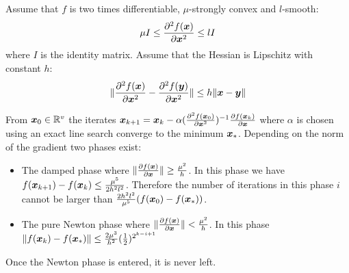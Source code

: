 \begin{prop}
  \label{eq:conv:newton}
  Assume that $f$ is two times differentiable, $\mu$-strongly convex and $l$-smooth:
  \begin{equation}
    \mu I \leq \partialfrac{\xb^2}{^2 f(\xb)} \leq l I
  \end{equation}
  where $I$ is the identity matrix.
  Assume that the Hessian is Lipschitz with constant $h$:
  \begin{equation}
  \| \partialfrac{\xb^2}{^2 f(\xb)} - \partialfrac{\xb^2}{^2 f(\yb)} \| \leq h \| \xb
  - \yb \|
 \end{equation}

  From $\xb_0 \in \RR^v$  the iterates
  $\xb_{k+1} = \xb_k -\alpha (\partialfrac{\xb^2}{^2 f(\xb_0)})^{-1}
  \partialfrac{\xb}{f(\xb_k)}$ where $\alpha$ is chosen using an exact line
  search converge to the
  minimum $\xb_*$.
  Depending on the norm of the gradient two phases exist:
  \begin{itemize}
  \item The damped phase where $\| \partialfrac{\xb}{f(\xb)} \| \geq \frac{\mu^2}{h}$.
    In this phase we have $f(\xb_{k+1}) - f(\xb_k) \leq \frac{\mu^5}{2h^2 l^2}$.
    Therefore the number of iterations in this phase $i$ cannot be larger than
    $\frac{2 h^2 l^2}{\mu^5}(f(\xb_0) - f(\xb_*))$.
  \item The pure Newton phase where $\| \partialfrac{\xb}{f(\xb)} \| < \frac{\mu^2}{h}$.
      In this phase $\|f(\xb_{k}) - f(\xb_*)\| \leq \frac{2 \mu^3}{h^2}
      (\frac12)^{2^{k -i +1}}$
 \end{itemize}
 Once the Newton phase is entered, it is never left.
\end{prop}
